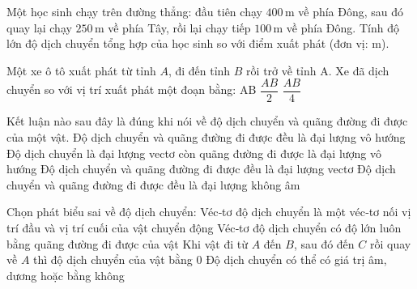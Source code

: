 \begin{ex}
Một học sinh chạy trên đường thẳng: đầu tiên chạy $400\,\text{m}$ về phía Đông, sau đó quay lại chạy $250\,\text{m}$ về phía Tây, rồi lại chạy tiếp $100\,\text{m}$ về phía Đông. Tính độ lớn độ dịch chuyển tổng hợp của học sinh so với điểm xuất phát (đơn vị: m).
\end{ex}

\begin{ex}
Một xe ô tô xuất phát từ tỉnh $A$, đi đến tỉnh $B$ rồi trở về tỉnh A. Xe đã dịch chuyển so với vị trí xuất phát một đoạn bằng:
\choice
{AB}
{}
{$\dfrac{AB}{2}$}
{$\dfrac{AB}{4}$}
\end{ex}

\begin{ex}
Kết luận nào sau đây là đúng khi nói về độ dịch chuyển và quãng đường đi được của một vật.
\choice
{Độ dịch chuyển và quãng đường đi được đều là đại lượng vô hướng}
{\True Độ dịch chuyển là đại lượng vectơ còn quãng đường đi được là đại lượng vô hướng}
{Độ dịch chuyển và quãng đường đi được đều là đại lượng vectơ}
{Độ dịch chuyển và quãng đường đi được đều là đại lượng không âm}
\end{ex}

\begin{ex}
Chọn phát biểu sai về độ dịch chuyển:
\choice
{Véc‑tơ độ dịch chuyển là một véc‑tơ nối vị trí đầu và vị trí cuối của vật chuyển động}
{\True Véc‑tơ độ dịch chuyển có độ lớn luôn bằng quãng đường đi được của vật}
{Khi vật đi từ $A$ đến $B$, sau đó đến $C$ rồi quay về $A$ thì độ dịch chuyển của vật bằng 0}
{Độ dịch chuyển có thể có giá trị âm, dương hoặc bằng không}
\end{ex}

